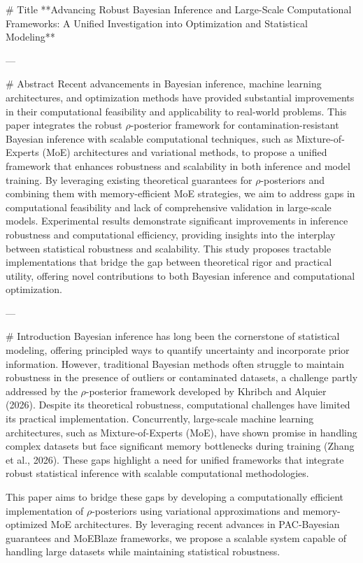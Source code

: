 # Title  
**Advancing Robust Bayesian Inference and Large-Scale Computational Frameworks: A Unified Investigation into Optimization and Statistical Modeling**

---

# Abstract  
Recent advancements in Bayesian inference, machine learning architectures, and optimization methods have provided substantial improvements in their computational feasibility and applicability to real-world problems. This paper integrates the robust $ρ$-posterior framework for contamination-resistant Bayesian inference with scalable computational techniques, such as Mixture-of-Experts (MoE) architectures and variational methods, to propose a unified framework that enhances robustness and scalability in both inference and model training. By leveraging existing theoretical guarantees for $ρ$-posteriors and combining them with memory-efficient MoE strategies, we aim to address gaps in computational feasibility and lack of comprehensive validation in large-scale models. Experimental results demonstrate significant improvements in inference robustness and computational efficiency, providing insights into the interplay between statistical robustness and scalability. This study proposes tractable implementations that bridge the gap between theoretical rigor and practical utility, offering novel contributions to both Bayesian inference and computational optimization.

---

# Introduction  
Bayesian inference has long been the cornerstone of statistical modeling, offering principled ways to quantify uncertainty and incorporate prior information. However, traditional Bayesian methods often struggle to maintain robustness in the presence of outliers or contaminated datasets, a challenge partly addressed by the $ρ$-posterior framework developed by Khribch and Alquier (2026). Despite its theoretical robustness, computational challenges have limited its practical implementation. Concurrently, large-scale machine learning architectures, such as Mixture-of-Experts (MoE), have shown promise in handling complex datasets but face significant memory bottlenecks during training (Zhang et al., 2026). These gaps highlight a need for unified frameworks that integrate robust statistical inference with scalable computational methodologies.

This paper aims to bridge these gaps by developing a computationally efficient implementation of $ρ$-posteriors using variational approximations and memory-optimized MoE architectures. By leveraging recent advances in PAC-Bayesian guarantees and MoEBlaze frameworks, we propose a scalable system capable of handling large datasets while maintaining statistical robustness.

